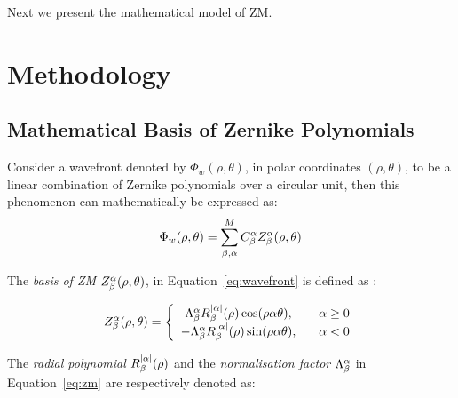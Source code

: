 Next we present the mathematical model of ZM.
 


\section{Methodology}	   \label{chap5:mkbeams}

\subsection{Mathematical Basis of Zernike Polynomials}	   \label{chap5:zernike}


Consider a wavefront  denoted by $\Phi_{w}(\rho,\theta)$, in polar coordinates $(\rho,\theta)$, to be a linear combination of Zernike polynomials over a circular unit, then this phenomenon can mathematically be expressed as:
\begin{equation}
 \Phi_{w}(\rho,\theta) = \sum\limits_{\rm \beta, \rm \alpha}^{M} C_{\rm \beta}^{\rm \alpha}Z_{\rm \beta}^{\rm \alpha}(\rho,\theta) %
  \label{eq:wavefront}
\end{equation}
%

\noindent The \textit{basis of ZM} $Z_{\rm \beta}^{\rm \alpha}(\rho,\theta)$, in Equation~\ref{eq:wavefront} is defined as \citep{2015arXiv150607396F}: 
 
 \begin{equation}  \label{eq:zm}
Z_{\rm \beta}^{\rm \alpha}(\rho,\theta) = \left\{ \begin{array}{cc} 
                \Lambda_{\rm \beta}^{\rm \alpha} R_{\rm \beta}^{\lvert \rm \alpha \rvert}(\rho) \cos(\rho \rm \alpha \theta), & \hspace{3mm} \rm \alpha \geq 0 \\
                -\Lambda_{\rm \beta}^{\rm \alpha} R_{\rm \beta}^{\lvert \rm \alpha \rvert}(\rho) \sin(\rho \rm \alpha \theta), & \hspace{3mm} \rm \alpha < 0\\                
                \end{array} \right.
\end{equation}

\noindent The \textit{radial polynomial} $R_{\rm \beta}^{\lvert \rm \alpha \rvert}(\rho)$ and the \textit{normalisation factor} $\Lambda_{\rm \beta}^{\rm \alpha}$ in Equation~\ref{eq:zm} are respectively denoted as:\\

